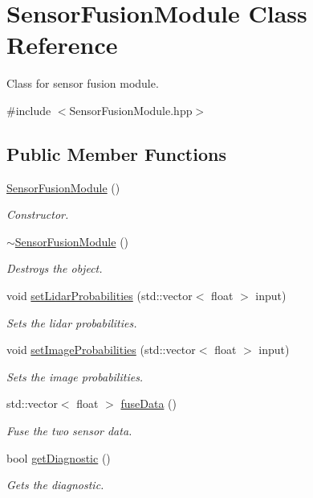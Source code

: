 \hypertarget{class_sensor_fusion_module}{}\section{Sensor\+Fusion\+Module Class Reference}
\label{class_sensor_fusion_module}


Class for sensor fusion module.  




{\ttfamily \#include $<$Sensor\+Fusion\+Module.\+hpp$>$}

\subsection*{Public Member Functions}
\begin{DoxyCompactItemize}
\item 
\hyperlink{class_sensor_fusion_module_a197b81625100b2b15d339be6fc15c657}{Sensor\+Fusion\+Module} ()
\begin{DoxyCompactList}\small\item\em Constructor. \end{DoxyCompactList}\item 
\hyperlink{class_sensor_fusion_module_a771099181db2311c47a13b56b93819fb}{$\sim$\+Sensor\+Fusion\+Module} ()
\begin{DoxyCompactList}\small\item\em Destroys the object. \end{DoxyCompactList}\item 
void \hyperlink{class_sensor_fusion_module_aa1b418548d329fd79a498edfc476d2b2}{set\+Lidar\+Probabilities} (std\+::vector$<$ float $>$ input)
\begin{DoxyCompactList}\small\item\em Sets the lidar probabilities. \end{DoxyCompactList}\item 
void \hyperlink{class_sensor_fusion_module_af169a79d8e241ba090b13b079d173080}{set\+Image\+Probabilities} (std\+::vector$<$ float $>$ input)
\begin{DoxyCompactList}\small\item\em Sets the image probabilities. \end{DoxyCompactList}\item 
std\+::vector$<$ float $>$ \hyperlink{class_sensor_fusion_module_a13d1756444b5d5e984aed678bed30103}{fuse\+Data} ()
\begin{DoxyCompactList}\small\item\em Fuse the two sensor data. \end{DoxyCompactList}\item 
bool \hyperlink{class_sensor_fusion_module_a8bb7397254888c4204ceeb9540659d4a}{get\+Diagnostic} ()
\begin{DoxyCompactList}\small\item\em Gets the diagnostic. \end{DoxyCompactList}\end{DoxyCompactItemize}



